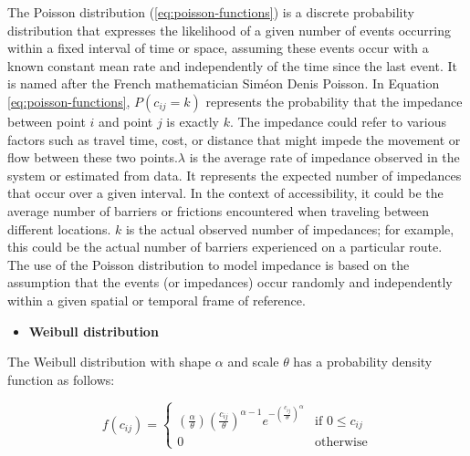 \documentclass[
11pt, %
oneside, %
english, %
singlespacing, %
]{macthesis} %
\def\tightlist{}
\begin{document}
The Poisson distribution (\ref{eq:poisson-functions}) is a discrete probability distribution that expresses the likelihood of a given number of events occurring within a fixed interval of time or space, assuming these events occur with a known constant mean rate and independently of the time since the last event. It is named after the French mathematician Siméon Denis Poisson. In Equation \ref{eq:poisson-functions}, \(P(c_{ij} =k)\) represents the probability that the impedance between point \(i\) and point \(j\) is exactly \(k\). The impedance could refer to various factors such as travel time, cost, or distance that might impede the movement or flow between these two points.\(\lambda\) is the average rate of impedance observed in the system or estimated from data. It represents the expected number of impedances that occur over a given interval. In the context of accessibility, it could be the average number of barriers or frictions encountered when traveling between different locations. \(k\) is the actual observed number of impedances; for example, this could be the actual number of barriers experienced on a particular route. The use of the Poisson distribution to model impedance is based on the assumption that the events (or impedances) occur randomly and independently within a given spatial or temporal frame of reference.

\begin{itemize}
\tightlist
\item
  \textbf{Weibull distribution}
\end{itemize}

The Weibull distribution with shape \(\alpha\) and scale \(\theta\) has a probability density function as follows:

\begin{equation}
f(c_{ij}) =
\begin{cases}
\left( \frac{\alpha}{\theta}\right) \left( \frac{c_{ij}}{\theta}\right)^{\alpha - 1} e^{-\left(\frac{c_{ij}}{\theta}\right)^\alpha} & \text{if } 0 \leq c_{ij} \\
0 & \text{otherwise}
\end{cases}
\label{eq:weibull-functions}
\end{equation}
\end{document}
